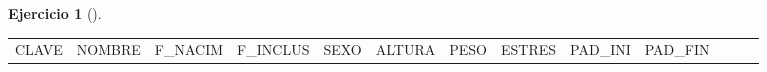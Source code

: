 \documentclass[
  a4paper,
]{scrreport}
\theoremstyle{definition}
\newtheorem{exercise}{Ejercicio}[chapter]
\theoremstyle{remark}
\begin{document}
\begin{exercise}[]
\begin{enumerate}
\begin{tcolorbox}
  \begin{longtable}[]{@{}
    >{\raggedleft\arraybackslash}p{}
    >{\raggedright\arraybackslash}p{}
    >{\raggedright\arraybackslash}p{}
    >{\raggedright\arraybackslash}p{}
    >{\raggedleft\arraybackslash}p{}
    >{\raggedleft\arraybackslash}p{}
    >{\raggedleft\arraybackslash}p{}
    >{\raggedleft\arraybackslash}p{}
    >{\raggedleft\arraybackslash}p{}
    >{\raggedleft\arraybackslash}p{}
    >{\raggedleft\arraybackslash}p{}
    >{\raggedleft\arraybackslash}p{}
    >{\raggedright\arraybackslash}p{}@{}}
  \toprule\noalign{}
  \begin{minipage}[b]{\linewidth}\raggedleft
  CLAVE
  \end{minipage} & \begin{minipage}[b]{\linewidth}\raggedright
  NOMBRE
  \end{minipage} & \begin{minipage}[b]{\linewidth}\raggedright
  F\_NACIM
  \end{minipage} & \begin{minipage}[b]{\linewidth}\raggedright
  F\_INCLUS
  \end{minipage} & \begin{minipage}[b]{\linewidth}\raggedleft
  SEXO
  \end{minipage} & \begin{minipage}[b]{\linewidth}\raggedleft
  ALTURA
  \end{minipage} & \begin{minipage}[b]{\linewidth}\raggedleft
  PESO
  \end{minipage} & \begin{minipage}[b]{\linewidth}\raggedleft
  ESTRES
  \end{minipage} & \begin{minipage}[b]{\linewidth}\raggedleft
  PAD\_INI
  \end{minipage} & \begin{minipage}[b]{\linewidth}\raggedleft
  PAD\_FIN
  \end{minipage} & \begin{minipage}[b]{\linewidth}\raggedleft

\end{minipage}
\end{longtable}
\end{tcolorbox}
\end{enumerate}
\end{exercise}
\end{document}

